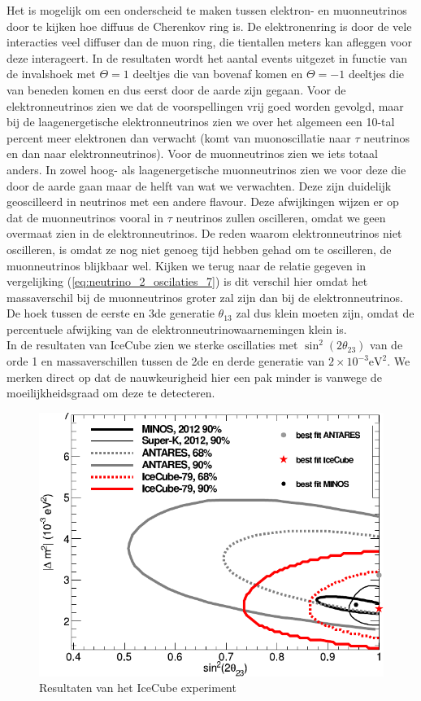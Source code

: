 \documentclass[../main.tex]{subfiles}
\begin{document}
Het is mogelijk om een onderscheid te maken tussen elektron- en muonneutrinos door te kijken hoe diffuus de Cherenkov ring is. De elektronenring is door de vele interacties veel diffuser dan de muon ring, die tientallen meters kan afleggen voor deze interageert. In de resultaten wordt het aantal events uitgezet in functie van de invalshoek met $\Theta = 1$ deeltjes die van bovenaf komen en $\Theta = -1$ deeltjes die van beneden komen en dus eerst door de aarde zijn gegaan. Voor de elektronneutrinos zien we dat de voorspellingen vrij goed worden gevolgd, maar bij de laagenergetische elektronneutrinos zien we over het algemeen een 10-tal percent meer elektronen dan verwacht (komt van muonoscillatie naar $\tau$ neutrinos en dan naar elektronneutrinos). Voor de muonneutrinos zien we iets totaal anders. In zowel hoog- als laagenergetische muonneutrinos zien we voor deze die door de aarde gaan maar de helft van wat we verwachten. Deze zijn duidelijk geoscilleerd in neutrinos met een andere flavour. Deze afwijkingen wijzen er op dat de muonneutrinos vooral in $\tau$ neutrinos zullen oscilleren, omdat we geen overmaat zien in de elektronneutrinos. De reden waarom elektronneutrinos niet oscilleren, is omdat ze nog niet genoeg tijd hebben gehad om te oscilleren, de muonneutrinos blijkbaar wel. Kijken we terug naar de relatie gegeven in vergelijking (\ref{eq:neutrino_2_oscilaties_7}) is dit verschil hier omdat het massaverschil bij de muonneutrinos groter zal zijn dan bij de elektronneutrinos. De hoek tussen de eerste en 3de generatie $\theta_{13}$ zal dus klein moeten zijn, omdat de percentuele afwijking van de elektronneutrinowaarnemingen klein is.\\
In de resultaten van IceCube zien we sterke oscillaties met $\sin^2(2\theta_{23})$ van de orde 1 en massaverschillen tussen de 2de en derde generatie van $2\times 10^{-3}\text{eV}^2$. We merken direct op dat de nauwkeurigheid hier een pak minder is vanwege de moeilijkheidsgraad om deze te detecteren.

\begin{figure}[h]
    \centering
    \includegraphics[width=0.5\linewidth]{neutrinos/icecube.png}
    \caption{Resultaten van het IceCube experiment}%
    \label{fig:neutrinos/icecube}
\end{figure}
\end{document}
